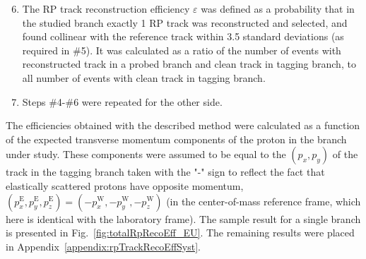 \begin{enumerate}\setcounter{enumi}{5}
\item The RP track reconstruction efficiency $\varepsilon$ was defined as a probability that in the studied branch exactly 1 RP track was reconstructed and selected, and found collinear with the reference track within 3.5 standard deviations (as required in \#5). It was calculated as a ratio of the number of events with reconstructed track in a probed branch and clean track in tagging branch, to all number of events with clean track in tagging branch.\vspace{-4pt}
\item Steps \#4-\#6 were repeated for the other side.
\end{enumerate}


The efficiencies obtained with the described method were calculated as a function of the expected transverse momentum components of the proton in the branch under study. These components were assumed to be equal to the $(p_{x},p_{y})$ of the track in the tagging branch taken with the "-" sign to reflect the fact that elastically scattered protons have opposite momentum, $(p_{x}^{\text{E}},p_{y}^{\text{E}},p_{z}^{\text{E}}) = (-p_{x}^{\text{W}},-p_{y}^{\text{W}},-p_{z}^{\text{W}})$ (in the center-of-mass reference frame, which here is identical with the laboratory frame). The sample result for a single branch is presented in Fig.~\ref{fig:totalRpRecoEff_EU}. The remaining results were placed in Appendix~\ref{appendix:rpTrackRecoEffSyst}.



